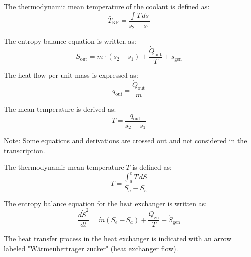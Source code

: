 The thermodynamic mean temperature of the coolant is defined as:  
\[
\bar{T}_{\text{KF}} = \frac{\int T \, ds}{s_2 - s_1}
\]  

The entropy balance equation is written as:  
\[
\dot{S}_{\text{out}} = \dot{m} \cdot (s_2 - s_1) + \frac{\dot{Q}_{\text{out}}}{T} + s_{\text{gen}}
\]  

The heat flow per unit mass is expressed as:  
\[
q_{\text{out}} = \frac{\dot{Q}_{\text{out}}}{\dot{m}}
\]  

The mean temperature is derived as:  
\[
\bar{T} = \frac{q_{\text{out}}}{s_2 - s_1}
\]  

Note: Some equations and derivations are crossed out and not considered in the transcription.

The thermodynamic mean temperature \( T \) is defined as:  
\[
T = \frac{\int_a^e T \, dS}{S_a - S_e}
\]

The entropy balance equation for the heat exchanger is written as:  
\[
\frac{d\dot{S}^2}{dt} = \dot{m}(S_e - S_a) + \frac{\dot{Q}_{\text{zu}}}{T} + \dot{S}_{\text{gen}}
\]

The heat transfer process in the heat exchanger is indicated with an arrow labeled "Wärmeübertrager zucker" (heat exchanger flow).